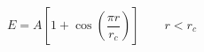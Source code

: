 \documentclass[12pt]{article}
\begin{document}
$$
   E = A \left[ 1 + \cos\left(\frac{\pi r}{r_c}\right) \right]
   \qquad r < r_c
$$
\end{document}
